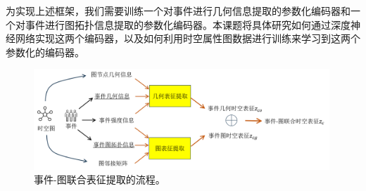 \documentclass[12pt,UTF8,AutoFakeBold=2,a4paper]{ctexart} %
\begin{document}
为实现上述框架，我们需要训练一个对事件进行几何信息提取的参数化编码器和一个对事件进行图拓扑信息提取的参数化编码器。本课题将具体研究如何通过深度神经网络实现这两个编码器，以及如何利用时空属性图数据进行训练来学习到这两个参数化的编码器。
\begin{figure}[t]
\centering
\includegraphics[width=0.99\textwidth]{fig/event_embedding-new.png}    
\caption{{\kaishu 事件-图联合表征提取的流程。}}
\label{fig:embed}
\end{figure}
%
%
%
%
%
\end{document}
